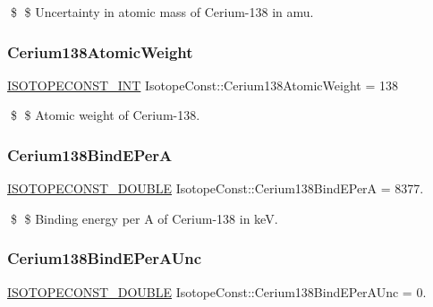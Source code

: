 \$ \$ Uncertainty in atomic mass of Cerium-\/138 in amu. \mbox{\label{group___isotope_const-_cerium-_ce138_ga7b06dbe4b5faf3af5de7d0ea6f2a2b25}} 
\subsubsection{\texorpdfstring{Cerium138\+Atomic\+Weight}{Cerium138AtomicWeight}}
{\footnotesize\ttfamily \mbox{\hyperlink{group___isotope_const-_macros_ga5f18360b3e99483a35c32d789e62621c}{I\+S\+O\+T\+O\+P\+E\+C\+O\+N\+S\+T\+\_\+\+I\+NT}} Isotope\+Const\+::\+Cerium138\+Atomic\+Weight = 138}

\$ \$ Atomic weight of Cerium-\/138. \mbox{\label{group___isotope_const-_cerium-_ce138_ga820756274181d896c3f8a595ee75d3f7}} 
\subsubsection{\texorpdfstring{Cerium138\+Bind\+E\+PerA}{Cerium138BindEPerA}}
{\footnotesize\ttfamily \mbox{\hyperlink{group___isotope_const-_macros_ga8f45a7272ce02c0b4c65c44636ed719a}{I\+S\+O\+T\+O\+P\+E\+C\+O\+N\+S\+T\+\_\+\+D\+O\+U\+B\+LE}} Isotope\+Const\+::\+Cerium138\+Bind\+E\+PerA = 8377.}

\$ \$ Binding energy per A of Cerium-\/138 in keV. \mbox{\label{group___isotope_const-_cerium-_ce138_ga15c7f56ff23db9b19b98361b58c8c129}} 
\subsubsection{\texorpdfstring{Cerium138\+Bind\+E\+Per\+A\+Unc}{Cerium138BindEPerAUnc}}
{\footnotesize\ttfamily \mbox{\hyperlink{group___isotope_const-_macros_ga8f45a7272ce02c0b4c65c44636ed719a}{I\+S\+O\+T\+O\+P\+E\+C\+O\+N\+S\+T\+\_\+\+D\+O\+U\+B\+LE}} Isotope\+Const\+::\+Cerium138\+Bind\+E\+Per\+A\+Unc = 0.}

